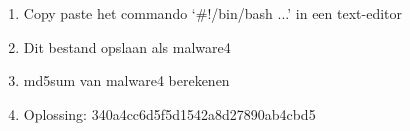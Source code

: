 \begin{enumerate}
  \item Copy paste het commando `\#!/bin/bash ...' in een text-editor
  \item Dit bestand opslaan als malware4
  \item md5sum van malware4 berekenen
  \item Oplossing: 340a4cc6d5f5d1542a8d27890ab4cbd5
\end{enumerate}